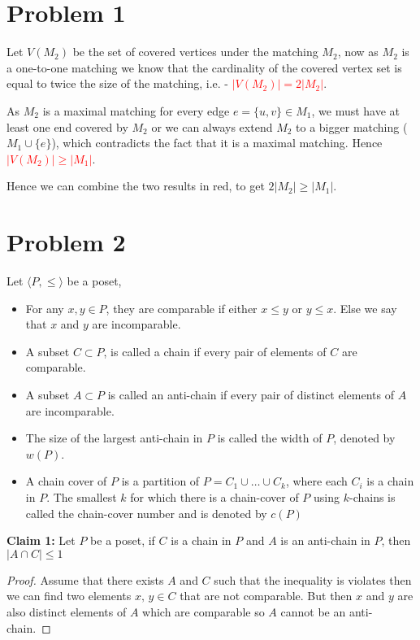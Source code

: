\documentclass{article}
\numberwithin{equation}{section}
\newcommand{\card}[1]{\left|#1\right|}
\begin{document}
\section*{Problem 1}
Let $V(M_2)$ be the set of covered vertices under the matching $M_2$, now as $M_2$ is a one-to-one matching we know that the cardinality of the covered vertex set is equal to twice the size of the matching, i.e. - \textcolor{red}{$\card{V(M_2)} = 2 \card{M_2}$}. 

As $M_2$ is a maximal matching for every edge $e = \{u, v\}\in M_1$, we must have at least one end covered by $M_2$ or we can always extend $M_2$ to a bigger matching ($M_1\cup \{e\}$), which contradicts the fact that it is a maximal matching. Hence \textcolor{red}{$\card{V(M_2)} \ge \card{M_1}$}. 

Hence we can combine the two results in red, to get $2\card{M_2} \ge \card{M_1}$. 
\newpage
\section*{Problem 2}
Let $\langle P, \le \rangle$ be a poset, 
\begin{itemize}
    \item For any $x, y \in P$, they are comparable if either $x \le y$ or $y \le x$. Else we say that $x$ and $y$ are incomparable. 
    \item A subset $C\subset P$, is called a chain if every pair of elements of $C$ are comparable. 
    \item A subset $A\subset P$ is called an anti-chain if every pair of distinct elements of $A$ are incomparable. 
    \item The size of the largest anti-chain in $P$ is called the width of $P$, denoted by $w(P)$. 
    \item A chain cover of $P$ is a partition of $P = C_1\cup \dots \cup C_k$, where each $C_i$ is a chain in $P$. The smallest $k$ for which there is a chain-cover of $P$ using $k$-chains is called the chain-cover number and is denoted by $c(P)$
\end{itemize}
\textbf{Claim 1:} Let $P$ be a poset, if $C$ is a chain in $P$ and $A$ is an anti-chain in $P$, then $\card{A\cap C} \le 1$
\begin{proof}
    Assume that there exists $A$ and $C$ such that the inequality is violates then we can find two elements $x, \, y\in C$ that are not comparable. But then $x$ and $y$ are also distinct elements of $A$ which are comparable so $A$ cannot be an anti-chain. 
\end{proof}
\end{document}
